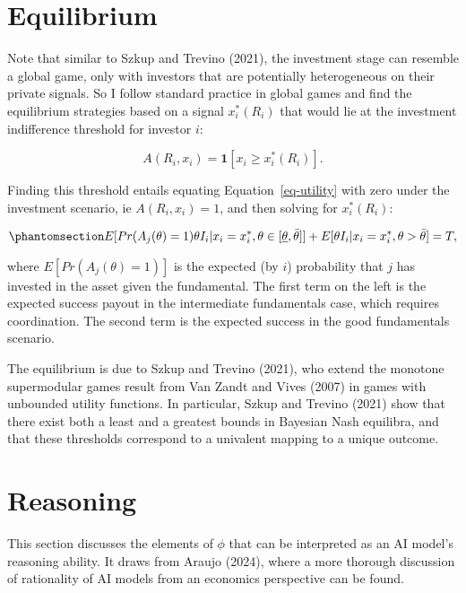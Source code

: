 \documentclass[
]{article}
\theoremstyle{plain}
\theoremstyle{remark}
\begin{document}
\section{Equilibrium}\label{equilibrium}

Note that similar to Szkup and Trevino (2021), the investment stage can
resemble a global game, only with investors that are potentially
heterogeneous on their private signals. So I follow standard practice in
global games and find the equilibrium strategies based on a signal
\(x_i^*(R_i)\) that would lie at the investment indifference threshold
for investor \(i\):

\[
A(R_i, x_i) = \mathbf{1}[x_i \geq x_i^*(R_i)].
\]

Finding this threshold entails equating Equation~\ref{eq-utility} with
zero under the investment scenario, ie \(A(R_i, x_i)=1\), and then
solving for \(x_i^*(R_i)\):

\begin{equation}\phantomsection\label{eq-equilinvest}{
E[Pr(A_j(\theta)=1)\theta I_i | x_i = x_i^*, \theta \in [\underline{\theta}, \bar{\theta}] ] + E[\theta I_i |x_i = x_i^*, \theta > \bar{\theta} ] = T,
}\end{equation}

where \(E[Pr(A_j(\theta)=1)]\) is the expected (by \(i\)) probability
that \(j\) has invested in the asset given the fundamental. The first
term on the left is the expected success payout in the intermediate
fundamentals case, which requires coordination. The second term is the
expected success in the good fundamentals scenario.

The equilibrium is due to Szkup and Trevino (2021), who extend the
monotone supermodular games result from Van Zandt and Vives (2007) in
games with unbounded utility functions. In particular, Szkup and Trevino
(2021) show that there exist both a least and a greatest bounds in
Bayesian Nash equilibra, and that these thresholds correspond to a
univalent mapping to a unique outcome.

\section{Reasoning}\label{sec-reasoning}

This section discusses the elements of \(\phi\) that can be interpreted
as an AI model's reasoning ability. It draws from Araujo (2024), where a
more thorough discussion of rationality of AI models from an economics
perspective can be found.
\end{document}

